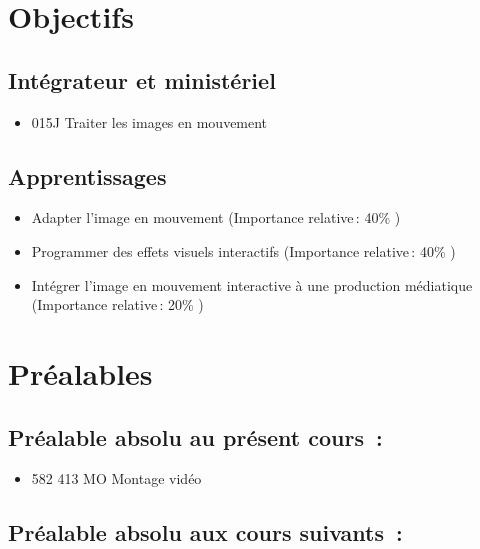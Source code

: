 \documentclass[
  french,
]{book}
\providecommand{\tightlist}{%
  \setlength{\itemsep}{0pt}\setlength{\parskip}{0pt}}
\begin{document}
\hypertarget{objectifs}{%
\section{Objectifs}\label{objectifs}}

\hypertarget{intuxe9grateur-et-ministuxe9riel}{%
\subsection{Intégrateur et ministériel}\label{intuxe9grateur-et-ministuxe9riel}}

\begin{itemize}
\tightlist
\item
  015J Traiter les images en mouvement
\end{itemize}

\hypertarget{apprentissages}{%
\subsection{Apprentissages}\label{apprentissages}}

\begin{itemize}
\tightlist
\item
  Adapter l'image en mouvement (Importance relative\,: 40\% )
\item
  Programmer des effets visuels interactifs (Importance relative\,: 40\% )
\item
  Intégrer l'image en mouvement interactive à une production médiatique (Importance relative\,: 20\% )
\end{itemize}

\hypertarget{pruxe9alables}{%
\section{Préalables}\label{pruxe9alables}}

\hypertarget{pruxe9alable-absolu-au-pruxe9sent-cours}{%
\subsection{Préalable absolu au présent cours~:}\label{pruxe9alable-absolu-au-pruxe9sent-cours}}

\begin{itemize}
\tightlist
\item
  582 413 MO Montage vidéo
\end{itemize}

\hypertarget{pruxe9alable-absolu-aux-cours-suivants}{%
\subsection{Préalable absolu aux cours suivants~:}\label{pruxe9alable-absolu-aux-cours-suivants}}
\end{document}
